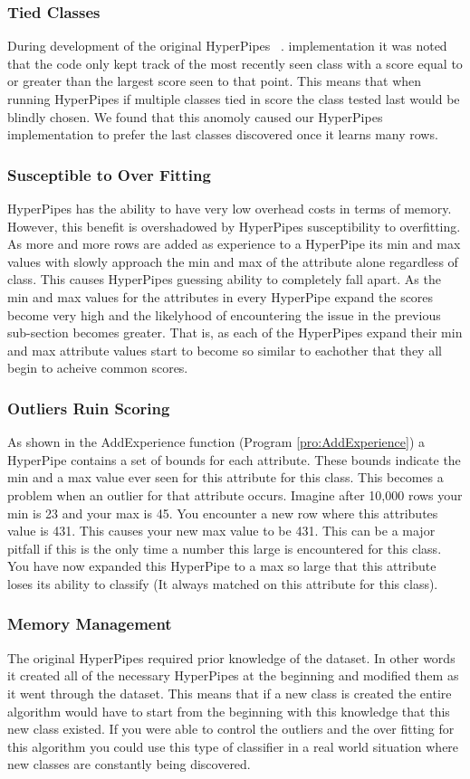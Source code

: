 \subsubsection{Tied Classes}
During development of the original HyperPipes ~\cite{Eisenstein04}. implementation it was noted 
that the code only kept track of the most recently seen class with a score 
equal to or greater than the largest score seen to that point. This means
that when running HyperPipes if multiple classes tied in score the class
tested last would be blindly chosen. We found that this anomoly caused our 
HyperPipes implementation to prefer the last classes discovered once it 
learns many rows.
\subsubsection{Susceptible to Over Fitting}
HyperPipes has the ability to have very low overhead costs in terms of 
memory. However, this benefit is overshadowed by HyperPipes susceptibility 
to overfitting. As more and more rows are added as experience to a HyperPipe 
its min and max values with slowly approach the min and max of the attribute 
alone regardless of class. This causes HyperPipes guessing ability to 
completely fall apart. As the min and max values for the attributes in every
HyperPipe expand the scores become very high and the likelyhood of 
encountering the issue in the previous sub-section becomes greater. That is, 
as each of the HyperPipes expand their min and max attribute values start to 
become so similar to eachother that they all begin to acheive common scores.
\subsubsection{Outliers Ruin Scoring}
As shown in the AddExperience function (Program \ref{pro:AddExperience}) a HyperPipe contains a set 
of bounds for each attribute. These bounds indicate the min and a max value 
ever seen for this attribute for this class. This becomes a problem when an 
outlier for that attribute occurs. Imagine after 10,000 rows your min is 23 
and your max is 45. You encounter a new row where this attributes value is 
431. This causes your new max value to be 431. This can be a major pitfall 
if this is the only time a number this large is encountered for this class. 
 You have now expanded this HyperPipe to a max so large that this attribute 
loses its ability to classify (It always matched on this attribute for this 
class).
\subsubsection{Memory Management}
The original HyperPipes required prior knowledge of the dataset. In other 
words it created all of the necessary HyperPipes at the beginning and 
modified them as it went through the dataset. This means that if a new class 
is created the entire algorithm would have to start from the beginning with 
this knowledge that this new class existed. If you were able to control the
outliers and the over fitting for this algorithm you could use this type of 
classifier in a real world situation where new classes are constantly being 
discovered. 